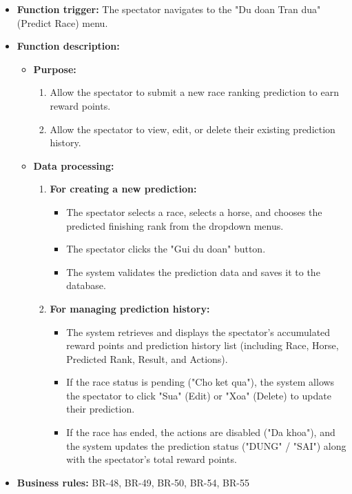 \begin{itemize}
    \item \textbf{Function trigger:} The spectator navigates to the "Du doan Tran dua" (Predict Race) menu.

    \item \textbf{Function description:}
    \begin{itemize}
        \item \textbf{Purpose:}
        \begin{enumerate}
            \item Allow the spectator to submit a new race ranking prediction to earn reward points.
            \item Allow the spectator to view, edit, or delete their existing prediction history.
        \end{enumerate}

        \item \textbf{Data processing:}
        \begin{enumerate}
            \item \textbf{For creating a new prediction:}
            \begin{itemize}
                \item The spectator selects a race, selects a horse, and chooses the predicted finishing rank from the dropdown menus.
                \item The spectator clicks the "Gui du doan" button.
                \item The system validates the prediction data and saves it to the database.
            \end{itemize}
            \item \textbf{For managing prediction history:}
            \begin{itemize}
                \item The system retrieves and displays the spectator's accumulated reward points and prediction history list (including Race, Horse, Predicted Rank, Result, and Actions).
                \item If the race status is pending ("Cho ket qua"), the system allows the spectator to click "Sua" (Edit) or "Xoa" (Delete) to update their prediction.
                \item If the race has ended, the actions are disabled ("Da khoa"), and the system updates the prediction status ("DUNG" / "SAI") along with the spectator's total reward points.
            \end{itemize}
        \end{enumerate}
    \end{itemize}
    \item \textbf{Business rules:} BR-48, BR-49, BR-50, BR-54, BR-55
\end{itemize}

